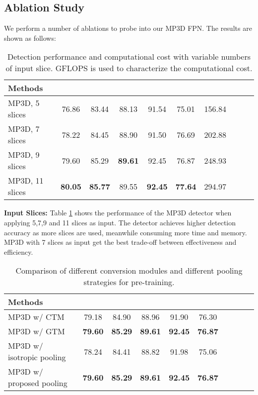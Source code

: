 \documentclass[runningheads]{llncs}
\begin{document}
\subsection{Ablation Study}
We perform a number of ablations to probe into our MP3D FPN. The results are shown as follows:

\begin{table}[!t]
    \caption{Detection performance and computational cost with variable numbers of input slice. GFLOPS is used to characterize the computational cost.}
    \label{tab:slice_num}
    \centering
    \footnotesize \setlength{\tabcolsep}{8pt}\renewcommand{\arraystretch}{1.2}\centering
\begin{tabular}{lccccccccc}
            \textbf{Methods} &  &  &  &  &  & \\
            \hline
            \hline
            MP3D, 5 slices  &76.86	&83.44&88.13 &91.54&75.01 & 156.84\\
	     MP3D, 7 slices &78.22	&84.45&88.90 &91.50&76.69 & 202.88\\
            MP3D, 9 slices &79.60 &85.29 & \textbf{89.61}  &92.45  &76.87 & 248.93\\
	      MP3D, 11 slices&\textbf{80.05}&\textbf{85.77}&89.55 &\textbf{92.45}&\textbf{77.64} & 294.97\\
        \end{tabular}
\end{table}

\noindent\textbf{Input Slices:} Table \ref{tab:slice_num} shows the performance of the MP3D detector when applying 5,7,9 and 11 slices as input. 
The detector achieves higher detection accuracy as more slices are used, meanwhile consuming more time and memory. MP3D with 7 slices as input get the best trade-off between effectiveness and efficiency. 

\begin{table}[!t]
    \caption{Comparison of different conversion modules and different pooling strategies for pre-training.}
    \label{tab:gtm}
    \centering
    \footnotesize \setlength{\tabcolsep}{8pt}\renewcommand{\arraystretch}{1.2}\centering
\begin{tabular}{lccccccccc}
            \textbf{Methods} &  &  &  &   & \\
\hline
            \hline
            MP3D w/ CTM &79.18	&84.90 &88.96	  &91.90  &76.30 \\
            MP3D w/ GTM &\textbf{79.60} &\textbf{85.29} & \textbf{89.61}  & \textbf{92.45}  &\textbf{76.87}  \\
            \hline
            MP3D w/ isotropic pooling  &78.24	&84.41	   &88.82	&91.98  &75.06\\
            MP3D w/ proposed pooling &\textbf{79.60} &\textbf{85.29} & \textbf{89.61}  & \textbf{92.45}  &\textbf{76.87}  \\
        \end{tabular}
\end{table}
\end{document}
